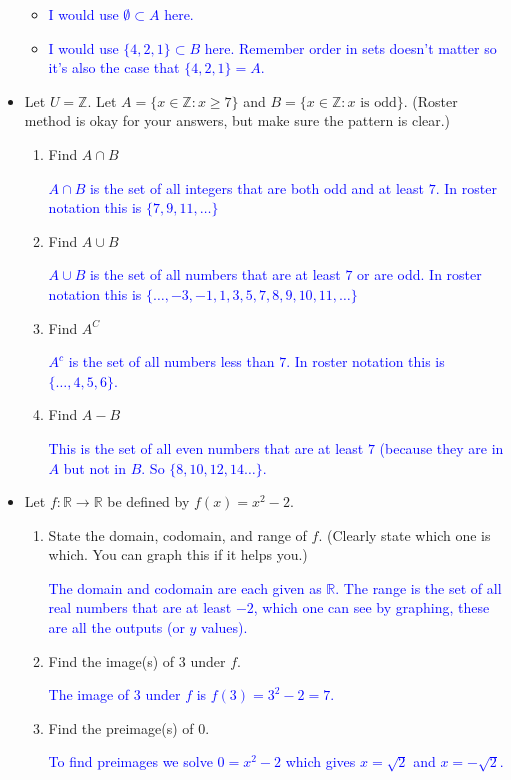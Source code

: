 \documentclass[10pt]{article}
\newcommand{\R}{\mathbb{R}}
\newcommand{\Z}{\mathbb{Z}}
\newcommand{\blue}{\textcolor{blue}}
\newcommand{\bs}{\begin{solution}}
\begin{document}
\begin{itemize}
\begin{itemize}
		\item  \bs \blue{I would use $\emptyset \subset A$ here.} \end{solution}

		\item \bs \blue{I would use $\{4,2,1\} \subset B$ here. Remember order in sets doesn't matter so it's also the case that $\{4,2,1\}=A$.}\end{solution}

		\end{itemize}

\newpage

\item[S2-2] Let $U = \Z$. Let $A = \{x\in \Z: x\ge 7\}$ and $B = \{x\in\Z: x \text{ is odd}\}$.  (Roster method is okay for your answers, but make sure the pattern is clear.)
		\begin{enumerate}
		\item Find $A\cap B$ \bs \blue{$A\cap B$ is the set of all integers that are both odd and at least $7$. In roster notation this is $\{7,9,11,\dots\}$}\end{solution}
		\vfill
		\item Find $A \cup B$ 
		\bs \blue{$A\cup B$ is the set of all numbers that are at least $7$ or are odd. In roster notation this is $\{\dots, -3,-1,1,3,5,7,8,9,10,11,\dots\}$} \end{solution}
		\vfill
		\item Find $A^C$ 
		\bs \blue{$A^c$ is the set of all numbers less than $7$. In roster notation this is $\{\dots, 4,5,6\}$.}\end{solution}
		\vfill
		\item Find $A-B$ \bs \blue{This is the set of all even numbers that are at least $7$ (because they are in $A$ but not in $B$. So $\{8,10,12,14\dots\}$.}\end{solution}
\vfill
		\end{enumerate}


\item[S3-1]  Let $f: \mathbb{R} \to \mathbb{R}$ be defined by $f(x) = x^2-2$.
		\begin{enumerate}
		\item State the domain, codomain, and range of $f$. (Clearly state which one is which. You can graph this if it helps you.)
		
	\bs \blue{The domain and codomain are each given as $\R$. The range is the set of all real numbers that are at least $-2$, which one can see by graphing, these are all the outputs (or $y$ values).}\end{solution}
		\vfill
		\item Find the image(s) of $3$ under $f$.
		\bs \blue{The image of $3$ under $f$ is $f(3) = 3^2-2 = 7$.}\end{solution}
		\vfill
		\item Find the preimage(s) of $0$.
		\bs \blue{To find preimages we solve $0=x^2-2$ which gives $x=\sqrt{2}$ and $x= -\sqrt{2}$.}\end{solution}
		\vfill
		\end{enumerate}


\end{itemize}	
\end{document}
